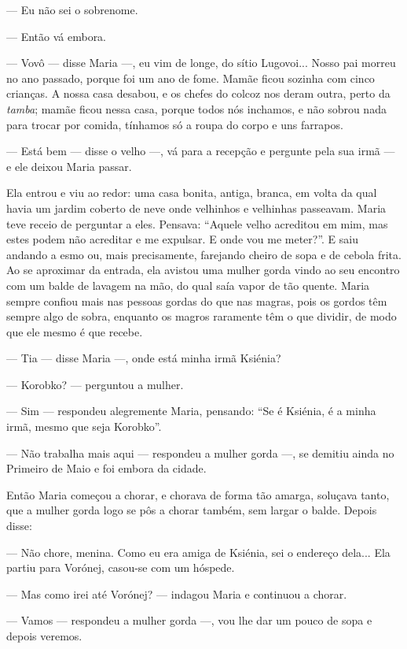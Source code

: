 --- Eu não sei o sobrenome.

--- Então vá embora.

--- Vovô --- disse Maria ---, eu vim de longe, do sítio Lugovoi... Nosso
pai morreu no ano passado, porque foi um ano de fome. Mamãe ficou
sozinha com cinco crianças. A nossa casa desabou, e os chefes do colcoz
nos deram outra, perto da \emph{tamba}; mamãe ficou nessa casa, porque
todos nós inchamos, e não sobrou nada para trocar por comida, tínhamos
só a roupa do corpo e uns farrapos.

--- Está bem --- disse o velho ---, vá para a recepção e pergunte pela
sua irmã --- e ele deixou Maria passar.

Ela entrou e viu ao redor: uma casa bonita, antiga, branca, em volta da
qual havia um jardim coberto de neve onde velhinhos e velhinhas
passeavam. Maria teve receio de perguntar a eles. Pensava: ``Aquele
velho acreditou em mim, mas estes podem não acreditar e me expulsar. E
onde vou me meter?''. E saiu andando a esmo ou, mais precisamente,
farejando cheiro de sopa e de cebola frita. Ao se aproximar da entrada,
ela avistou uma mulher gorda vindo ao seu encontro com um balde de
lavagem na mão, do qual saía vapor de tão quente. Maria sempre confiou
mais nas pessoas gordas do que nas magras, pois os gordos têm sempre
algo de sobra, enquanto os magros raramente têm o que dividir, de modo
que ele mesmo é que recebe.

--- Tia --- disse Maria ---, onde está minha irmã Ksiénia?

--- Korobko? --- perguntou a mulher.

--- Sim --- respondeu alegremente Maria, pensando: ``Se é Ksiénia, é a
minha irmã, mesmo que seja Korobko''.

--- Não trabalha mais aqui --- respondeu a mulher gorda ---, se demitiu
ainda no Primeiro de Maio e foi embora da cidade.

Então Maria começou a chorar, e chorava de forma tão amarga, soluçava
tanto, que a mulher gorda logo se pôs a chorar também, sem largar o
balde. Depois disse:

--- Não chore, menina. Como eu era amiga de Ksiénia, sei o endereço
dela... Ela partiu para Vorónej, casou-se com um hóspede.

--- Mas como irei até Vorónej? --- indagou Maria e continuou a chorar.

--- Vamos --- respondeu a mulher gorda ---, vou lhe dar um pouco de sopa
e depois veremos.

